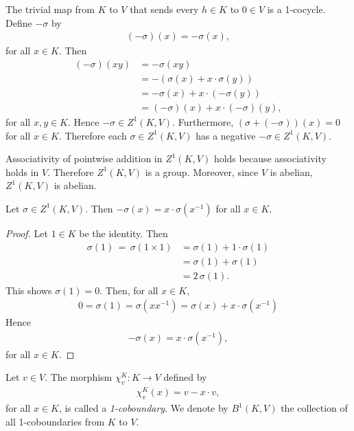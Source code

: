 The trivial map from $K$ to $V$ that sends every $h \in K$ to $0 \in V$ is a 1-cocycle. 
Define $-\sigma$ by
\begin{align*}
	(-\sigma)(x) = -\sigma(x),
\end{align*}
for all $x \in K$. Then
\begin{align*}
	(-\sigma)(xy) &= -\sigma(xy) \\
		&= -\left(\sigma(x) + x \cdot \sigma(y)\right) \\
		&= -\sigma(x) + x\cdot (-\sigma(y)) \\
		&= (-\sigma)(x) + x \cdot (-\sigma)(y),
\end{align*}
for all $x,y \in K$. Hence $-\sigma \in Z^1(K, V)$. Furthermore, $(\sigma + (-\sigma))(x) = 0$ for all $x \in K$. Therefore each $\sigma \in Z^1(K, V)$ has a negative $-\sigma\in Z^1(K, V)$.

Associativity of pointwise addition in $Z^1(K, V)$ holds because associativity holds in $V$. Therefore $Z^1\left(K, V\right)$ is a group. Moreover, since $V$ is abelian, $Z^1(K, V)$ is abelian.
\begin{lemma} Let $\sigma \in Z^1(K, V)$. Then $-\sigma(x) = x \cdot \sigma(x^{-1})$ for all $x \in K$.
\end{lemma}
\begin{proof}
Let $1\in K$ be the identity. Then
\begin{align*}
	\sigma(1)\, =\, \sigma(1\times 1) &=  \sigma(1) + 1\cdot \sigma(1) \\
	&=  \sigma(1) + \sigma(1) \\
	&=  2\,\sigma(1).
\end{align*}
This shows $\sigma(1) = 0$. Then, for all $x \in K$,
\begin{align*}
	0 = \sigma(1) = \sigma(xx^{-1}) = \sigma(x) + x \cdot \sigma(x^{-1})
\end{align*}
Hence
\begin{align*}
	-\sigma(x) = x\cdot\sigma(x^{-1}),
\end{align*}
for all $x \in K$. 
\end{proof}

\begin{definition} Let $v \in V$. The morphism $\chi^K_v:K\rightarrow V$ defined by
\begin{align*}
	\chi^K_v (x) = v - x\cdot v,
\end{align*}
for all $x \in K$, is called a \emph{1-coboundary}. We denote by $B^1\left(K, V\right)$ the collection of all 1-coboundaries from $K$ to $V$. 
\end{definition}

